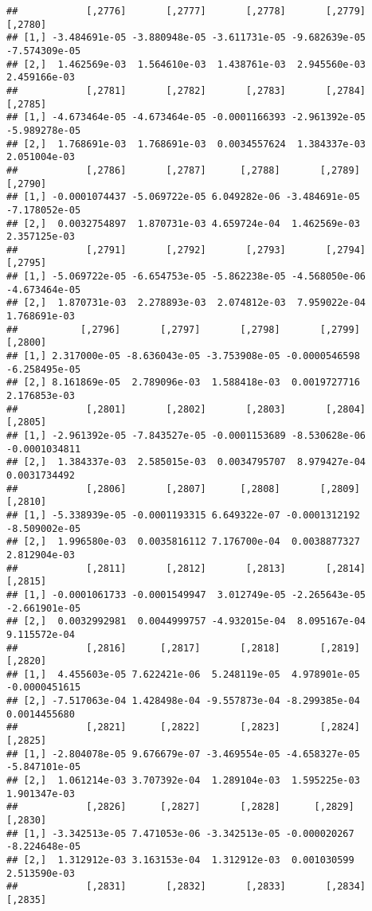 \documentclass[
]{article}
\begin{document}
\begin{verbatim}
##            [,2776]       [,2777]       [,2778]       [,2779]       [,2780]
## [1,] -3.484691e-05 -3.880948e-05 -3.611731e-05 -9.682639e-05 -7.574309e-05
## [2,]  1.462569e-03  1.564610e-03  1.438761e-03  2.945560e-03  2.459166e-03
##            [,2781]       [,2782]       [,2783]       [,2784]       [,2785]
## [1,] -4.673464e-05 -4.673464e-05 -0.0001166393 -2.961392e-05 -5.989278e-05
## [2,]  1.768691e-03  1.768691e-03  0.0034557624  1.384337e-03  2.051004e-03
##            [,2786]       [,2787]      [,2788]       [,2789]       [,2790]
## [1,] -0.0001074437 -5.069722e-05 6.049282e-06 -3.484691e-05 -7.178052e-05
## [2,]  0.0032754897  1.870731e-03 4.659724e-04  1.462569e-03  2.357125e-03
##            [,2791]       [,2792]       [,2793]       [,2794]       [,2795]
## [1,] -5.069722e-05 -6.654753e-05 -5.862238e-05 -4.568050e-06 -4.673464e-05
## [2,]  1.870731e-03  2.278893e-03  2.074812e-03  7.959022e-04  1.768691e-03
##           [,2796]       [,2797]       [,2798]       [,2799]       [,2800]
## [1,] 2.317000e-05 -8.636043e-05 -3.753908e-05 -0.0000546598 -6.258495e-05
## [2,] 8.161869e-05  2.789096e-03  1.588418e-03  0.0019727716  2.176853e-03
##            [,2801]       [,2802]       [,2803]       [,2804]       [,2805]
## [1,] -2.961392e-05 -7.843527e-05 -0.0001153689 -8.530628e-06 -0.0001034811
## [2,]  1.384337e-03  2.585015e-03  0.0034795707  8.979427e-04  0.0031734492
##            [,2806]       [,2807]      [,2808]       [,2809]       [,2810]
## [1,] -5.338939e-05 -0.0001193315 6.649322e-07 -0.0001312192 -8.509002e-05
## [2,]  1.996580e-03  0.0035816112 7.176700e-04  0.0038877327  2.812904e-03
##            [,2811]       [,2812]       [,2813]       [,2814]       [,2815]
## [1,] -0.0001061733 -0.0001549947  3.012749e-05 -2.265643e-05 -2.661901e-05
## [2,]  0.0032992981  0.0044999757 -4.932015e-04  8.095167e-04  9.115572e-04
##            [,2816]      [,2817]       [,2818]       [,2819]       [,2820]
## [1,]  4.455603e-05 7.622421e-06  5.248119e-05  4.978901e-05 -0.0000451615
## [2,] -7.517063e-04 1.428498e-04 -9.557873e-04 -8.299385e-04  0.0014455680
##            [,2821]      [,2822]       [,2823]       [,2824]       [,2825]
## [1,] -2.804078e-05 9.676679e-07 -3.469554e-05 -4.658327e-05 -5.847101e-05
## [2,]  1.061214e-03 3.707392e-04  1.289104e-03  1.595225e-03  1.901347e-03
##            [,2826]      [,2827]       [,2828]      [,2829]       [,2830]
## [1,] -3.342513e-05 7.471053e-06 -3.342513e-05 -0.000020267 -8.224648e-05
## [2,]  1.312912e-03 3.163153e-04  1.312912e-03  0.001030599  2.513590e-03
##            [,2831]       [,2832]       [,2833]       [,2834]       [,2835]

\end{verbatim}
\end{document}
